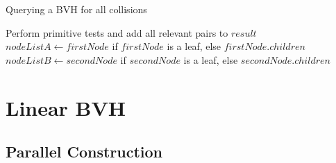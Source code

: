 \begin{algorithm}
	\label{alg:BVHQuery}
	\caption{Querying a BVH for all collisions}
	\begin{algorithmic}[1]
		\State Perform primitive tests and add all relevant pairs to $result$		
		\Else
		\State $nodeListA \gets firstNode$ if $firstNode$ is a leaf, else $firstNode.children$
		\State $nodeListB \gets secondNode$ if $secondNode$ is a leaf, else $secondNode.children$
		\State {}
		\EndFor
		\EndIf
		\EndIf
		\EndProcedure
	\end{algorithmic}
\end{algorithm}

\FloatBarrier
\section{Linear BVH}
\label{sec:lbvh}

\subsection{Parallel Construction}
\label{sub-sec-lbvhcons}

